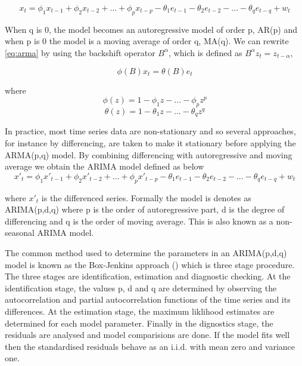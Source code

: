         \begin{equation} \label{eq:arma}
          x_{t} = \phi_{1}x_{t-1} + \phi_{2}x_{t-2} + ... + \phi_{p}x_{t-p} - \theta_{1}e_{t-1}
          - \theta_{2}e_{t-2} - ... - \theta_{q}e_{t-q} + w_{t}
        \end{equation}

When q is 0, the model becomes an autoregressive model of order p, AR(p) and when p is 0 the model
is a moving average of order q, MA(q). We can rewrite \ref{eq:arma} by using the backshift
operator $B^{\alpha}$, which is defined as $B^{\alpha}z_{t} = z_{t-\alpha}$,

        \begin{equation} \label{eq:armarewrite}
          \phi(B)x_{t} = \theta(B)e_{t}
        \end{equation}

where
        \begin{equation}
            \phi(z) = 1 - \phi_{1}z - ... - \phi_{p}z^{p}
        \end{equation}
        \begin{equation}
            \theta(z) = 1 - \theta_{1}z - ... - \theta_{q}z^{q}
        \end{equation}

In practice, most time series data are non-stationary and so several approaches, for instance
by differencing, are taken to make it stationary before applying the ARMA(p,q) model. By
combining differencing with autoregressive and moving average we obtain the ARIMA model defined
as below
        \begin{equation} \label{eq:arima}
          x'_{t} = \phi_{1}x'_{t-1} + \phi_{2}x'_{t-2} + ... + \phi_{p}x'_{t-p} -
          \theta_{1}e_{t-1} - \theta_{2}e_{t-2} - ... - \theta_{q}e_{t-q} + w_{t}
        \end{equation}

where $x'_{t}$ is the differenced series. Formally the model is denotes as ARIMA(p,d,q) where p
is the order of autoregressive part, d is the degree of differencing and q is the order of moving
average. This is also known as a non-seasonal ARIMA model.

The common method used to determine the parameters in an ARIMA(p,d,q) model is known as the
Box-Jenkins approach (\citet{box2015time}) which is three stage procedure. The three stages are
identification, estimation and diagnostic checking. At the identification stage, the values p, d
and q are determined by observing the autocorrelation and partial autocorrelation functions of
the time series and its differences. At the estimation stage, the maximum liklihood estimates are
determined for each model parameter. Finally in the dignostics stage, the residuals are analysed
and model comparisions are done. If the model fits well then the standardised residuals behave as
an i.i.d. with mean zero and variance one.

